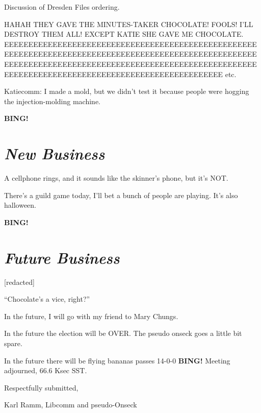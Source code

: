 \documentclass[10pt]{article}
\newcommand{\bing}{{\bf BING!} }
\newcommand{\goto}[1]{\bing \vskip 12pt \section*{{\em{#1}}}}
\begin{document}
Discussion of Dresden Files ordering.

HAHAH THEY GAVE THE MINUTES-TAKER CHOCOLATE!  FOOLS!  I'LL DESTROY THEM
ALL!  EXCEPT KATIE SHE GAVE ME CHOCOLATE.
EEEEEEEEEEEEEEEEEEEEEEEEEEEEEEEEEEEEEEEEEEEEEEEEEEEEEEEEEEEEEEEEEEEEEEEEEEEEEEEEEEEEEEEEEEEEEEEEEEEEEEEEEEEEEEEEEEEEEEEEEEEEEEEEEEEEEEEEEEEEEEEEEEEEEEEEEEEEEEEEEEEEEEEEEEEEEEEEEEEEEEEEEEEEEEEEEEEEEEEEE  etc.

Katiecomm:  I made a mold, but we didn't test it because people were
hogging the injection-molding machine. 

\Algol

\goto{New Business}

A cellphone rings, and it sounds like the skinner's phone, but it's NOT.

There's a guild game today, I'll bet a bunch of people are playing.  It's
also halloween.

\goto{Future Business}

[redacted]

``Chocolate's a vice, right?''

In the future, I will go with my friend to Mary Chungs.

In the future the election will be OVER.
The pseudo onseck goes a little bit spare.

In the future there will be flying bananas passes 14-0-0\sp
\bing
\noindent
Meeting adjourned, 66.6 Ksec SST.

\vspace{18pt}

\centerline{Respectfully submitted,}
\centerline{Karl Ramm, Libcomm and pseudo-Onseck}
\end{document}
